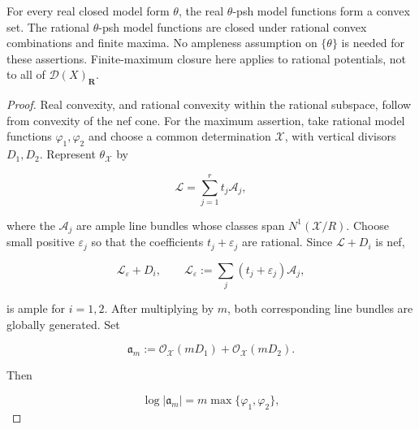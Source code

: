 \begin{proposition}\label{prop:ch20-model-max}
For every real closed model form \(\theta\), the real \(\theta\)-psh
model functions form a convex set.  The rational \(\theta\)-psh model
functions are closed under rational convex combinations and finite maxima.
No ampleness assumption on \(\{\theta\}\) is needed for these assertions.
Finite-maximum closure here applies to rational potentials, not to all of
\(\mathcal D(X)_{\mathbf R}\).
\end{proposition}

\begin{proof}
Real convexity, and rational convexity within the rational subspace,
follow from convexity of the nef cone.  For the maximum assertion, take
rational model functions
\(\varphi_1,\varphi_2\) and choose a common determination
\(\mathcal X\), with vertical divisors \(D_1,D_2\).  Represent
\(\theta_{\mathcal X}\) by

\begin{equation}
\label{eq:ch20-ample-basis}
                    \mathcal L=\sum_{j=1}^r t_j\mathcal A_j,
\end{equation}

where the \(\mathcal A_j\) are ample line bundles whose classes span
\(N^1(\mathcal X/R)\).  Choose small positive \(\varepsilon_j\) so that
the coefficients \(t_j+\varepsilon_j\) are rational.  Since
\(\mathcal L+D_i\) is nef,

\begin{equation}
\label{eq:ch20-ample-perturbation}
              \mathcal L_\varepsilon+D_i,
              \qquad
              \mathcal L_\varepsilon
                :=\sum_j(t_j+\varepsilon_j)\mathcal A_j,
\end{equation}

is ample for \(i=1,2\).  After multiplying by \(m\), both corresponding
line bundles are globally generated.  Set

\begin{equation}
\label{eq:ch20-max-ideal}
 \mathfrak a_m
   :=\mathcal O_{\mathcal X}(mD_1)
       +\mathcal O_{\mathcal X}(mD_2).
\end{equation}

Then

\begin{equation}
\label{eq:ch20-max-ideal-function}
             \log|\mathfrak a_m|
                  =m\max\{\varphi_1,\varphi_2\},
\end{equation}


\end{proof}
